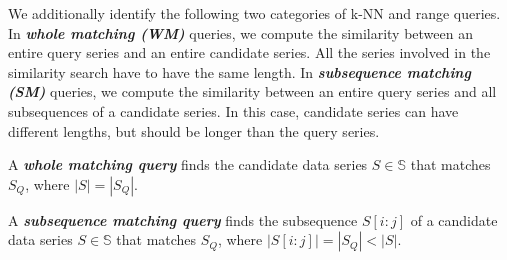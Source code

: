 %
We additionally identify the following two categories of k-NN and range queries.
In \textit{\textbf{whole matching (WM)}} queries, we compute the similarity between an entire query series and an entire candidate series.
All the series involved in the similarity search have to have the same length.
In \textit{\textbf{subsequence matching (SM)}} queries, we compute the similarity between an entire query series and all subsequences of a candidate series.
In this case, candidate series can have different lengths, but should be longer than the query series. 

\begin{defn} \label{def:wholematch}
	A \textit{\textbf{whole matching query}} finds the candidate data series $S \in \mathbb{S}$ that matches $S_Q$, where $|S|=|S_Q|$. 
\end{defn}

\begin{defn} \label{def:submatch}
	A \textit{\textbf{subsequence matching query}} finds the subsequence $S[i:j]$ of a candidate data series $S \in \mathbb{S}$ that matches $S_Q$, where $|S[i:j]| = |S_Q| < |S|$.
\end{defn}




